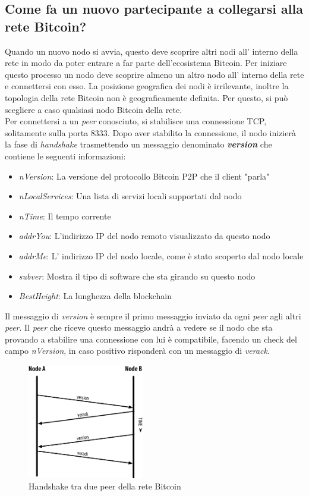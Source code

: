 \subsection{Come fa un nuovo partecipante a collegarsi alla rete Bitcoin?}
Quando un nuovo nodo si avvia, questo deve scoprire altri nodi all' interno della rete in modo da poter entrare a far parte dell'ecosistema Bitcoin. Per iniziare questo processo un nodo deve scoprire almeno un altro nodo all' interno della rete e connettersi con esso. La posizione geografica dei nodi \`e irrilevante, inoltre la topologia della rete Bitcoin non \`e geograficamente definita. Per questo, si pu\`o scegliere a caso qualsiasi nodo Bitcoin della rete.\\
Per connettersi a un \textit{peer} conosciuto, si stabilisce una connessione TCP, solitamente sulla porta 8333. Dopo aver stabilito la connessione, il nodo inizier\`a la fase di \textit{handshake} trasmettendo un messaggio denominato \textbf{\textit{version}} che contiene le seguenti informazioni:
\begin{itemize}
\item \textit{nVersion}:
La versione del protocollo Bitcoin P2P che il client "parla"
\item \textit{nLocalServices}:
Una lista di servizi locali supportati dal nodo
\item \textit{nTime}:
Il tempo corrente
\item \textit{addrYou}:
L'indirizzo IP del nodo remoto visualizzato da questo nodo
\item \textit{addrMe}:
L' indirizzo IP del nodo locale, come \`e stato scoperto dal nodo locale
\item \textit{subver}:
Mostra il tipo di software che sta girando su questo nodo
\item \textit{BestHeight}:
La lunghezza della blockchain 
\end{itemize}
Il messaggio di \textit{version} \`e sempre il primo messaggio inviato da ogni \textit{peer} agli altri \textit{peer}. Il \textit{peer} che riceve questo messaggio andr\`a a vedere se il nodo che sta provando a stabilire una connessione con lui \`e compatibile, facendo un check del campo \textit{nVersion}, in caso positivo risponder\`a con un messaggio di \textit{verack}.\\
\begin{figure}[!htb]
\begin{center}
   \includegraphics[width=0.455\textwidth]{imgs/connection.png}
   \caption{Handshake tra due peer della rete Bitcoin}
   \end{center}
   \hfill
\end{figure}\\\\
